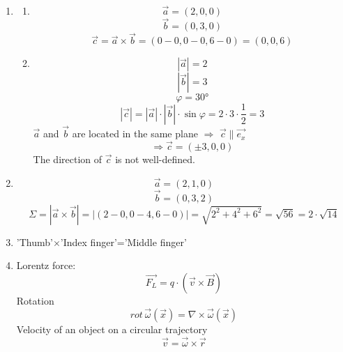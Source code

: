\documentclass{scrreprt}
\begin{document}
\begin{enumerate}
	\item
	\begin{enumerate}
		\item
		\begin{equation}
			\vec{a}=(2,0,0)
		\end{equation}
		\begin{equation}
			\vec{b}=(0,3,0)
		\end{equation}
		\begin{equation}
			\vec{c}=\vec{a}\times\vec{b}=(0-0,0-0,6-0)=(0,0,6)
		\end{equation}
		\item
		\begin{equation}
			\left|\vec{a}\right|=2
		\end{equation}
		\begin{equation}
			\left|\vec{b}\right|=3
		\end{equation}
		\begin{equation}
			\varphi=\ang{30}
		\end{equation}
		\begin{equation}
			\left|\vec{c}\right|=\left|\vec{a}\right|\cdot\left|\vec{b}\right|\cdot\sin{\varphi}=2\cdot 3\cdot\frac{1}{2}=3
		\end{equation}
		$\vec{a}$ and $\vec{b}$ are located in the same plane $\Rightarrow$ $\vec{c}\parallel\vec{e_x}$
		\begin{equation}
			\Rightarrow\vec{c}=(\pm3,0,0)
		\end{equation}
		The direction of $\vec{c}$ is not well-defined.
	\end{enumerate}
	\item
	\begin{equation}
		\vec{a}=(2,1,0)
	\end{equation}
	\begin{equation}
		\vec{b}=(0,3,2)
	\end{equation}
	\begin{equation}
		\Sigma=\left|\vec{a}\times\vec{b}\right|=\left|(2-0,0-4,6-0)\right|=\sqrt{2^2+4^2+6^2}=\sqrt{56}=2\cdot\sqrt{14}
	\end{equation}
	\item
	'Thumb'$\times$'Index finger'='Middle finger'
	\item
	Lorentz force:
	\begin{equation}
		\vec{F_L}=q\cdot(\vec{v}\times\vec{B})
	\end{equation}
	Rotation
	\begin{equation}
		rot\,\vec{\omega}(\vec{x})=\nabla\times\vec{\omega}(\vec{x})
	\end{equation}
	Velocity of an object on a circular trajectory 
	\begin{equation}
		\vec{v}=\vec{\omega}\times\vec{r}
	\end{equation}
\end{enumerate}
\end{document}
